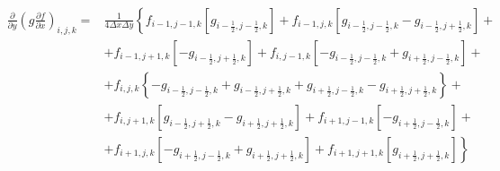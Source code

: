 \documentclass[12pt, a4paper]{article}
\newcommand\onehalf{\frac{1}{2}} %
\begin{document}
\begin{equation*}
    \begin{split}
        \left.
            \frac
                {\partial}
                {\partial y}
            \left(
                g
                \frac
                    {\partial f}
                    {\partial x}
            \right)
        \right._{i, j, k}
        = &
        \frac
            {1}
            {4 \Delta x \Delta y}
        \left\{
            f_{i - 1, j - 1, k}
            \left[
                g_{i - \onehalf, j - \onehalf, k}
            \right]
            +
            f_{i - 1, j, k}
            \left[
                g_{i - \onehalf, j - \onehalf, k}
                -
                g_{i - \onehalf, j + \onehalf, k}
            \right]
            +
        \right.
        \\ &
        \left.
            +
            f_{i - 1, j + 1, k}
            \left[
                -
                g_{i - \onehalf, j + \onehalf, k}
            \right]
            +
            f_{i, j - 1, k}
            \left[
                -
                g_{i - \onehalf, j - \onehalf, k}
                +
                g_{i + \onehalf, j - \onehalf, k}
            \right]
            +
        \right.
        \\ &
        \left.
            +
            f_{i, j, k}
            \left\{
                - g_{i - \onehalf, j - \onehalf, k}
                + g_{i - \onehalf, j + \onehalf, k}
                + g_{i + \onehalf, j - \onehalf, k}
                - g_{i + \onehalf, j + \onehalf, k}
            \right\}
            +
        \right.
        \\ &
        \left.
            +
            f_{i, j + 1, k}
            \left[
                g_{i - \onehalf, j + \onehalf, k}
                -
                g_{i + \onehalf, j + \onehalf, k}
            \right]
            +
            f_{i + 1, j - 1, k}
            \left[
                - g_{i + \onehalf, j - \onehalf, k}
            \right]
            +
        \right.
        \\ &
        \left.
            +
            f_{i + 1, j, k}
            \left[
                -
                g_{i + \onehalf, j - \onehalf, k}
                +
                g_{i + \onehalf, j + \onehalf, k}
            \right]
            +
            f_{i + 1, j + 1, k}
            \left[
                g_{i + \onehalf, j + \onehalf, k}
            \right]
        \right\}
    \end{split}
\end{equation*}
\end{document}
